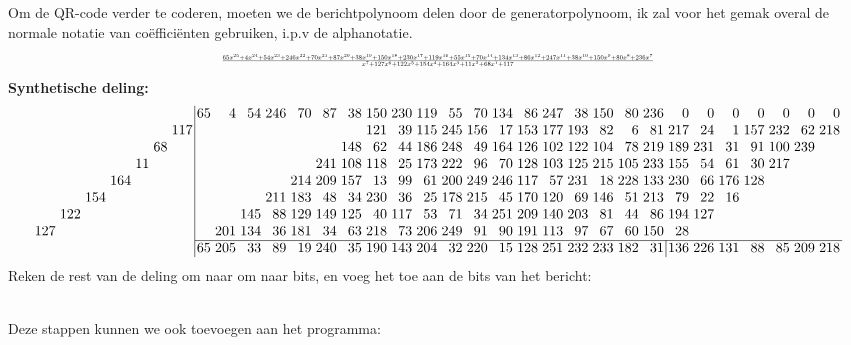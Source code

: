 \documentclass[a4paper]{article}
\begin{document}
\begin{landscape}
Om de QR-code verder te coderen, moeten we de berichtpolynoom delen door de generatorpolynoom, ik zal voor het gemak overal de normale notatie van coëfficiënten gebruiken, i.p.v de alphanotatie.
\begin{equation*}
\resizebox{0.9\hsize}{!}{$\frac{
65x^{25} + 4x^{24} + 54x^{23} + 246x^{22} + 70x^{21} + 87x^{20} + 38x^{19} + 150x^{18} + 230x^{17} + 119x^{16} + 55x^{15} + 70x^{14} + 134x^{13} + 86x^{12} + 247x^{11} + 38x^{10} + 150x^{9} + 80x^{8} + 236x^{7}
}{
x^{7} + 127x^{6} + 122x^{5} + 154x^{4} + 164x^{3} + 11x^{2} + 68x^{1} + 117
}
$}
\end{equation*}
\textbf{Synthetische deling:}
\[
\setlength{\tabcolsep}{1.5pt}
\begin{tabular}{rrrrrrr|rrrrrrrrrrrrrrrrrrrrrrrrrr}
&&&&&&&65&4&54&246&70&87&38&150&230&119&55&70&134&86&247&38&150&80&236&0&0&0&0&0&0&0\\
&&&&&&117&&&&&&&&121&39&115&245&156&17&153&177&193&82&6&81&217&24&1&157&232&62&218\\
&&&&&68&&&&&&&&148&62&44&186&248&49&164&126&102&122&104&78&219&189&231&31&91&100&239&\\
&&&&11&&&&&&&&241&108&118&25&173&222&96&70&128&103&125&215&105&233&155&54&61&30&217&&\\
&&&164&&&&&&&&214&209&157&13&99&61&200&249&246&117&57&231&18&228&133&230&66&176&128&&&\\
&&154&&&&&&&&211&183&48&34&230&36&25&178&215&45&170&120&69&146&51&213&79&22&16&&&&\\
&122&&&&&&&&145&88&129&149&125&40&117&53&71&34&251&209&140&203&81&44&86&194&127&&&&&\\
127&&&&&&&&201&134&36&181&34&63&218&73&206&249&91&90&191&113&97&67&60&150&28&&&&&&\\\cline{8-33}
&&&&&&&65&205&33&89&19&240&35&190&143&204&32&220&15&128&251&232&233&182&\multicolumn{1}{r|}{31}&136&226&131&88&85&209&218
\end{tabular}\]
Reken de rest van de deling om naar om naar bits, en voeg het toe aan de bits van het bericht:\\\\
\end{landscape}
\noindent
Deze stappen kunnen we ook toevoegen aan het programma:
\end{document}
